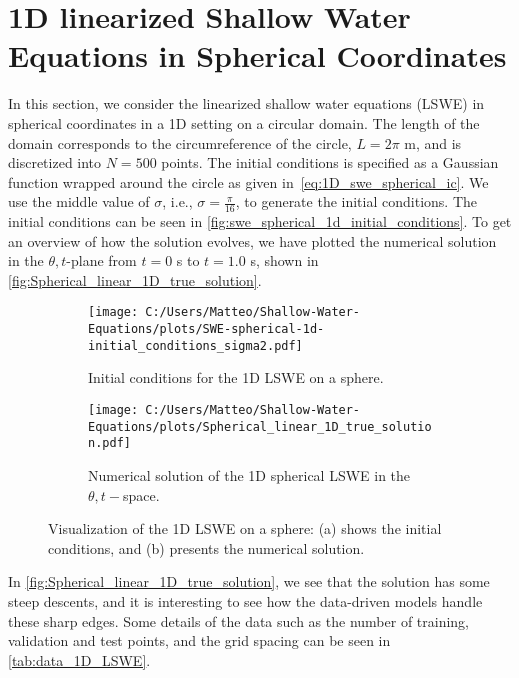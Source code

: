 \section{1D linearized Shallow Water Equations in Spherical Coordinates}
In this section, we consider the linearized shallow water equations (LSWE) in spherical coordinates in a 1D setting on a circular domain.
The length of the domain corresponds to the circumreference of the circle, $L = 2\pi$ m, and is discretized into $N = 500$ points.
The initial conditions is specified as a Gaussian function wrapped around the circle as given in~\eqref{eq:1D_swe_spherical_ic}.
We use the middle value of $\sigma$, i.e., $\sigma = \frac{\pi}{16}$, to generate the initial conditions.
The initial conditions can be seen in \autoref{fig:swe_spherical_1d_initial_conditions}.
To get an overview of how the solution evolves, we have plotted the numerical solution in the $\theta,t$-plane from $t = 0$ s to $t = 1.0$ s, shown in \autoref{fig:Spherical_linear_1D_true_solution}.
\begin{figure}[H]
    \centering
    \begin{subfigure}[t]{0.4\textwidth} %
        \centering
        \texttt{[image: C:/Users/Matteo/Shallow-Water-Equations/plots/SWE-spherical-1d-initial\_conditions\_sigma2.pdf]}
        \caption{Initial conditions for the 1D LSWE on a sphere.}\label{fig:swe_spherical_1d_initial_conditions}
    \end{subfigure}
    \hspace{0mm} %
    \begin{subfigure}[t]{0.5\textwidth} %
        \centering
        \texttt{[image: C:/Users/Matteo/Shallow-Water-Equations/plots/Spherical\_linear\_1D\_true\_solution.pdf]}
        \caption{Numerical solution of the 1D spherical LSWE in the $\theta,t-$space.}\label{fig:Spherical_linear_1D_true_solution}
    \end{subfigure}
    \caption{Visualization of the 1D LSWE on a sphere:
    (a) shows the initial conditions, and (b) presents the numerical solution.}\label{fig:LSWE_1D_sphere}
\end{figure}
In \autoref{fig:Spherical_linear_1D_true_solution}, we see that the solution has some steep descents, and it is interesting to see how the data-driven models handle these sharp edges.
Some details of the data such as the number of training, validation and test points, and the grid spacing can be seen in \autoref{tab:data_1D_LSWE}.
